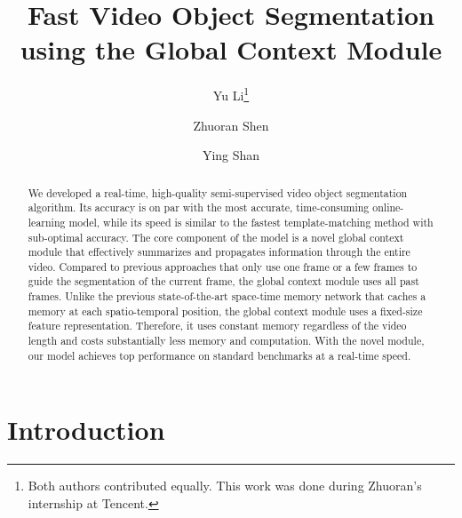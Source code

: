 \documentclass[runningheads]{llncs}
\makeatletter
\newcommand{\printfnsymbol}[1]{\textsuperscript{\@fnsymbol{#1}}}
\makeatother
\begin{document}
\pagestyle{headings}
\mainmatter
\def\ECCVSubNumber{1248}

\begin{comment}
    \title{Fast Video Object Segmentation using Global Context Module}
    \titlerunning{ECCV-20 submission ID \ECCVSubNumber} 
    \authorrunning{ECCV-20 submission ID \ECCVSubNumber} 
    \author{Anonymous ECCV submission}
    \institute{Paper ID \ECCVSubNumber}
\end{comment}

\title{Fast Video Object Segmentation using the Global Context Module}
    \author{
        Yu Li\thanks{Both authors contributed equally. This work was done during Zhuoran's internship at Tencent.} \and
        Zhuoran Shen\printfnsymbol{1}\and
        Ying Shan
    }



\maketitle

\begin{abstract}
We developed a real-time, high-quality semi-supervised video object segmentation algorithm. Its accuracy is on par with the most accurate, time-consuming online-learning model, while its speed is similar to the fastest template-matching method with sub-optimal accuracy. The core component of the model is a novel global context module that effectively summarizes and propagates information through the entire video. Compared to previous approaches that only use one frame or a few frames to guide the segmentation of the current frame, the global context module uses all past frames. Unlike the previous state-of-the-art space-time memory network that caches a memory at each spatio-temporal position, the global context module uses a fixed-size feature representation. Therefore, it uses constant memory regardless of the video length and costs substantially less memory and computation. With the novel module, our model achieves top performance on standard benchmarks at a real-time speed.
\end{abstract}

\section{Introduction}
\end{document}
